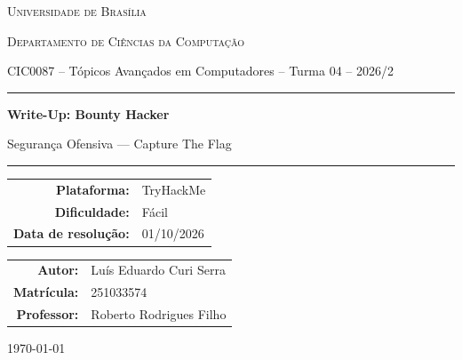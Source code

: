 \documentclass[12pt,a4paper]{article}
\newcommand{\desafioNome}{Bounty Hacker}
\newcommand{\plataforma}{TryHackMe}
\newcommand{\dificuldade}{Fácil}
\newcommand{\dataResolucao}{01/10/2026}
\newcommand{\autorNome}{Luís Eduardo Curi Serra}
\newcommand{\materia}{CIC0087 -- Tópicos Avançados em Computadores -- Turma 04 -- 2026/2}
\newcommand{\departamento}{Departamento de Ciências da Computação}
\newcommand{\matricula}{251033574}
\newcommand{\professor}{Roberto Rodrigues Filho}
\newcommand{\universidade}{Universidade de Brasília}
\begin{document}
\begin{titlepage}
  \thispagestyle{empty}
  \centering
  {\scshape \universidade \par}
  {\scshape \departamento \par}
  \vspace{0.4cm}
  {\small \materia \par}
  \vspace{2.5cm}

  \rule{\linewidth}{0.4pt}\par
  \vspace{0.6cm}
  {\huge \bfseries Write-Up: \desafioNome \par}
  \vspace{0.4cm}
  {\large Segurança Ofensiva --- Capture The Flag \par}
  \vspace{0.6cm}
  \rule{\linewidth}{0.4pt}\par

  \vspace{2.0cm}
  \begin{tabular}{rl}
    \textbf{Plataforma:}       & \plataforma       \\[4pt]
    \textbf{Dificuldade:}      & \dificuldade      \\[4pt]
    \textbf{Data de resolução:}& \dataResolucao    \\
  \end{tabular}

  \vfill

  \begin{tabular}{rl}
    \textbf{Autor:}     & \autorNome  \\[4pt]
    \textbf{Matrícula:} & \matricula  \\[4pt]
    \textbf{Professor:} & \professor  \\
  \end{tabular}

  \vspace{1.2cm}
  {\small \today \par}
\end{titlepage}

\newpage
\tableofcontents
\thispagestyle{fancy}
\newpage

\end{document}
